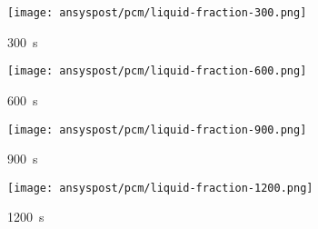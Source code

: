 \begin{figure}
    \centering

    \begin{minipage}[t]{0.485\textwidth}
        \centering
        \setlength{\tabcolsep}{1pt} %
        \begin{subfigure}[t]{0.16\textwidth}
            \centering
        \end{subfigure}%
        \hspace{2mm}%
        \begin{subfigure}[t]{0.2\textwidth}
            \centering
            \texttt{[image: ansyspost/pcm/liquid-fraction-300.png]}
            \caption{\SI{300}{\second}}\label{fig:liquid_fraction_300}
        \end{subfigure}%
        \begin{subfigure}[t]{0.2\textwidth}
            \centering
            \texttt{[image: ansyspost/pcm/liquid-fraction-600.png]}
            \caption{\SI{600}{\second}}\label{fig:liquid_fraction_600}
        \end{subfigure}%
        \begin{subfigure}[t]{0.2\textwidth}
            \centering
            \texttt{[image: ansyspost/pcm/liquid-fraction-900.png]}
            \caption{\SI{900}{\second}}\label{fig:liquid_fraction_900}
        \end{subfigure}%
        \begin{subfigure}[t]{0.2\textwidth}
            \centering
            \texttt{[image: ansyspost/pcm/liquid-fraction-1200.png]}
            \caption{\SI{1200}{\second}}\label{fig:liquid_fraction_1200}
        \end{subfigure}
        \caption{Flüssigkeitsanteil Konturen. Die Legende bezieht sich auf~\ref{fig:liquid_fraction_1200}}
        \label{fig:liquid_frac_kontur}
    \end{minipage}
    \hspace{2mm} %
    \begin{minipage}[t]{0.485\textwidth}
        \centering
        \begin{subfigure}[t]{0.16\textwidth}
            \centering

\end{subfigure}
\end{minipage}
\end{figure}
